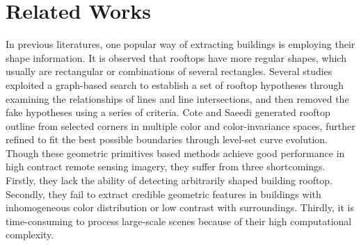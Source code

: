 \documentclass[runningheads]{llncs}
\begin{document}
\section{Related Works}
\label{section:relatedworks}
   In previous literatures, one popular way of extracting buildings is employing their shape information. It is observed that rooftops have more regular shapes, which usually are rectangular or combinations of several rectangles. Several studies   \cite{noronha2001detection,nosrati2009novel,izadi2012three,wang2015efficient} exploited a graph-based search to establish a set of rooftop hypotheses through examining the relationships of lines and line intersections, and then removed the fake hypotheses using a series of criteria. Cote and Saeedi \cite{cote2013automatic} generated rooftop outline from selected corners in  multiple color and color-invariance spaces, further refined to fit the best possible boundaries through level-set curve evolution. Though these geometric primitives based methods achieve good performance in high contract remote sensing imagery, they suffer from three  shortcomings. Firstly, they lack the ability of detecting arbitrarily shaped building rooftop. Secondly, they fail to  extract credible geometric features in buildings with inhomogeneous color distribution or low contrast with surroundings. Thirdly, it is time-consuming to process large-scale scenes because of their high computational complexity.	
   
\end{document}
